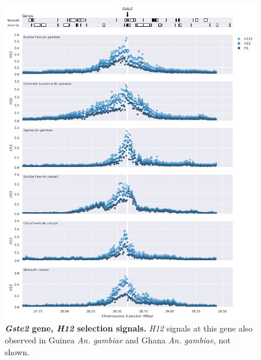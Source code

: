 \documentclass[a4paper,11pt,abstracton,hidelinks]{scrartcl}
\begin{document}
\begin{figure}[t!]
	\begin{center}
		\includegraphics*[width=1.1\linewidth,center]{artwork/locus_gste2_h12.png}
	\end{center}
	\caption[\textit{Gste2} gene, \textit{H12} selection signals]{
	\textbf{\textit{Gste2} gene, \textit{H12} selection signals.}
	\textit{H12} signals at this gene also observed in Guinea \textit{An. gambiae} and Ghana \textit{An. gambiae}, not shown. 
	} 
	\label{fig:locus_gste2_h12}
\end{figure}


\clearpage
\end{document}

